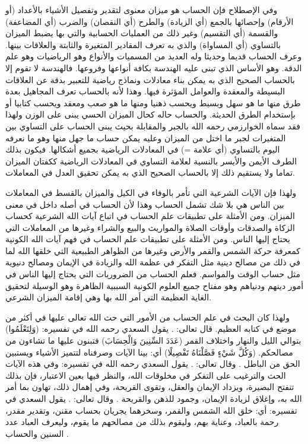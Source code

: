 وفي الإصطلاح فإن الحساب هو ميزان معنوى لتقدير وتفصيل الأشياء بالأعداد (أو الأرقام) وإحصائها بالجمع (أي الزيادة) والطرح (أي النقصان) والضرب (أي المضاعفة) والقسمة (أي التقسيم) وغير ذلك من العمليات الحسابية والتي بها يضبط الميزان بالتساوي (أي المساواة) والذي به تعرف المقادير المتغيرة والثابتة والعلاقات بينها. وعرف الحساب قديما وحديثا وله العديد من المسميات والأنواع وهو الرياضيات وهو علم الدقة. وهو الأساس الذي تبنى عليه الهندسة بكافة أنواعها وفروعها. فالهندسة لا تقوم إلا بالحساب الصحيح الذي به يمكن بناء معادلات ونماذج رياضية للتعبير بدقة عن العلاقات البسيطة والمعقدة والعوامل المؤثرة فيها. وهذا لأنه بالحساب تعرف المجاهيل بعدة طرق منها ما هو سهل وبسيط ويحسب ذهنيا ومنها ما هو صعب ومعقد ويحسب كتابيا أو بإستخدام الطرق الحديثة. والحساب حاله كحال الميزان الحسي يبنى على الوزن ولهذا فقد سماه الخوارزمي رحمه الله بالجبر والمقابلة بحيث يبنى الحساب على التساوي بين المتغيرات لجبر ما اختل من الميزان وعليه يمكن حساب ما جهل منها وهو ما نعرفه اليوم بالتساوي (أي علامة =) في المعادلات الرياضية بجميع أشكالها. فيكون بذلك الطرف الأيمن والأيسر بالنسية لعلامة التساوي في المعادلات الرياضية ككفتان الميزان تماما ولا يستقيم ذلك إلا بالحساب الصحيح الذي به يمكن تحقيق العدل في المعاملات.

ولهذا فإن الآيات الشرعية التي تأمر بالوفاء في الكيل والميزان بالقسط في المعاملات بين الناس هي بلا شك تشمل الحساب وهذا لأن الحساب في أصله داخل في معنى الميزان. ومن الأمثلة على تطبيقات علم الحساب في اتباع آيات الله الشرعية كحساب الزكاة والصدقات وأوقات الصلاة والمواريث والبيع والشراء وغيرها من المعاملات التي يحتاج إليها الناس.  ومن الأمثلة على تطبيقات علم الحساب في فهم آيات الله الكونية كمعرفة حركة الشمس والقمر والأرض وغيرها من الظواهر الطبيعية التي خلقها الله لما في ذلك من مصالح دينية مثل التفكر في عظمة الله والزيادة في الإيمان ومصالح دنيوية مثل حساب الوقت والمواسم. فعلم الحساب من الضروريات التي يحتاج إليها الناس في أمور دينهم ودنياهم وهو مفتاح جميع العلوم الكونية السببية الظاهرة وهو الوسيلة لتحقيق الغاية العظيمة التي أمر الله بها وهي إقامة الميزان الشرعي. 

ولهذا كان البحث في علم الحساب من الأمور التي حث الله تعالى عليها في أكثر من موضع في كتابه العظيم. قال تعالى: \quranayah*[17][12]{\footnotesize \surahname*[17]}. يقول السعدي رحمه الله في تفسيره: (وَلِتَعْلَمُوا) بتوالي الليل والنهار واختلاف القمر (عَدَدَ السِّنِينَ وَالْحِسَابَ) فتبنون عليها ما تشاءون من مصالحكم. (وَكُلَّ شَيْءٍ فَصَّلْنَاهُ تَفْصِيلًا) أي: بينا الآيات وصرفناه لتتميز الأشياء ويستبين الحق من الباطل \href{https://shamela.ws/book/42/1001#p1}{\faExternalLink} \cite{tafsir_Saadi}. وقال تعالى: \quranayah*[10][5]{\footnotesize \surahname*[10]}. يقول السعدي رحمه الله في تفسيره: وفي هذه الآيات الحث والترغيب على التفكر في مخلوقات الله، والنظر فيها بعين الاعتبار، فإن بذلك تنفتح البصيرة، ويزداد الإيمان والعقل، وتقوى القريحة، وفي إهمال ذلك، تهاون بما أمر الله به، وإغلاق لزيادة الإيمان، وجمود للذهن والقريحة \href{https://shamela.ws/book/42/729#p6}{\faExternalLink} \cite{tafsir_Saadi}. وقال تعالى: \quranayah*[55][5]{\footnotesize \surahname*[55]}. يقول السعدي في تفسيره: أي: خلق الله الشمس والقمر، وسخرهما يجريان بحساب مقنن، وتقدير مقدر، رحمة بالعباد، وعناية بهم، وليقوم بذلك من مصالحهم ما يقوم، وليعرف العباد عدد السنين والحساب \href{https://shamela.ws/book/42/1887#p6}{\faExternalLink} \cite{tafsir_Saadi}.

